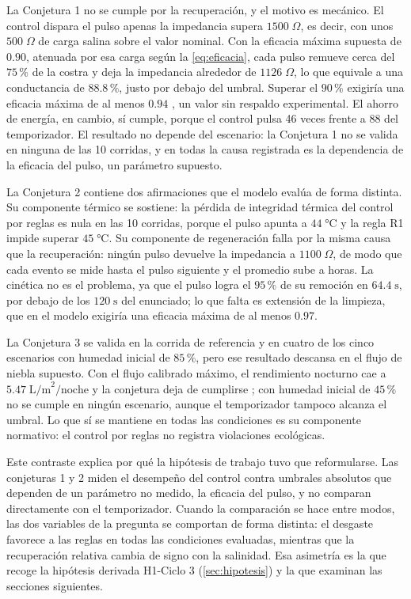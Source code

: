 La Conjetura 1 no se cumple por la recuperaci\'on, y el motivo es mec\'anico. El control dispara el pulso apenas la impedancia supera $1500\;\Omega$, es decir, con unos $500\;\Omega$ de carga salina sobre el valor nominal. Con la eficacia m\'axima supuesta de $0.90$, atenuada por esa carga seg\'un la \cref{eq:eficacia}, cada pulso remueve cerca del $75\,\%$ de la costra y deja la impedancia alrededor de $1126\;\Omega$, lo que equivale a una conductancia de $88.8\,\%$, justo por debajo del umbral. Superar el $90\,\%$ exigir\'ia una eficacia m\'axima de al menos $0.94$ \parencite[doc.~04, \S~5.6]{axioma2026engine}, un valor sin respaldo experimental. El ahorro de energ\'ia, en cambio, s\'i cumple, porque el control pulsa 46 veces frente a 88 del temporizador. El resultado no depende del escenario: la Conjetura 1 no se valida en ninguna de las 10 corridas, y en todas la causa registrada es la dependencia de la eficacia del pulso, un par\'ametro supuesto.

La Conjetura 2 contiene dos afirmaciones que el modelo eval\'ua de forma distinta. Su componente t\'ermico se sostiene: la p\'erdida de integridad t\'ermica del control por reglas es nula en las 10 corridas, porque el pulso apunta a $44\;\si{\celsius}$ y la regla R1 impide superar $45\;\si{\celsius}$. Su componente de regeneraci\'on falla por la misma causa que la recuperaci\'on: ning\'un pulso devuelve la impedancia a $1100\;\Omega$, de modo que cada evento se mide hasta el pulso siguiente y el promedio sube a horas. La cin\'etica no es el problema, ya que el pulso logra el $95\,\%$ de su remoci\'on en $64.4\;\text{s}$, por debajo de los $120\;\text{s}$ del enunciado; lo que falta es extensi\'on de la limpieza, que en el modelo exigir\'ia una eficacia m\'axima de al menos $0.97$.

La Conjetura 3 se valida en la corrida de referencia y en cuatro de los cinco escenarios con humedad inicial de $85\,\%$, pero ese resultado descansa en el flujo de niebla supuesto. Con el flujo calibrado m\'aximo, el rendimiento nocturno cae a $5.47\;\text{L/m}^2\text{/noche}$ y la conjetura deja de cumplirse \parencite[doc.~04, \S~8.6]{axioma2026engine}; con humedad inicial de $45\,\%$ no se cumple en ning\'un escenario, aunque el temporizador tampoco alcanza el umbral. Lo que s\'i se mantiene en todas las condiciones es su componente normativo: el control por reglas no registra violaciones ecol\'ogicas.

Este contraste explica por qu\'e la hip\'otesis de trabajo tuvo que reformularse. Las conjeturas 1 y 2 miden el desempe\~no del control contra umbrales absolutos que dependen de un par\'ametro no medido, la eficacia del pulso, y no comparan directamente con el temporizador. Cuando la comparaci\'on se hace entre modos, las dos variables de la pregunta se comportan de forma distinta: el desgaste favorece a las reglas en todas las condiciones evaluadas, mientras que la recuperaci\'on relativa cambia de signo con la salinidad. Esa asimetr\'ia es la que recoge la hip\'otesis derivada H1-Ciclo 3 (\cref{sec:hipotesis}) y la que examinan las secciones siguientes.

